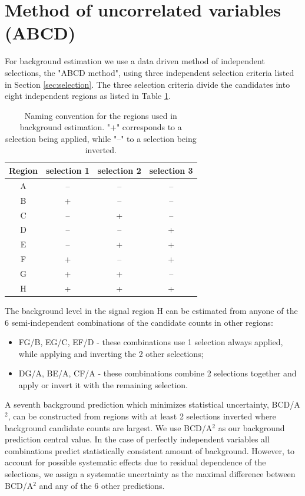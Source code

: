 
\section{Method of uncorrelated variables (ABCD)}
\label{sec:abcd}
For background estimation we use a data driven method of independent selections, the "ABCD method", using
 three independent selection criteria listed in Section \ref{sec:selection}. 
The three selection criteria divide the candidates into eight
independent regions as listed in Table \ref{tab:regions}.

\begin{table}[htbp]
\centering
\caption{Naming convention for the regions used in background estimation. "+" corresponds to a selection 
being applied, while "--" to a selection being inverted. \label{tab:regions}}
\begin{tabular}{cccc}
 \hline
  Region & selection 1 & selection 2 & selection 3 \\
 \hline
 A & -- & -- & -- \\
 B & + & -- & -- \\
 C & -- & + & -- \\
 D & -- & -- & + \\
 E & -- & + & + \\
 F & + & -- & + \\
 G & + & + & -- \\
 H & + & + & + \\
\hline
\end{tabular} 
\end{table}

The background level in the signal region H can be estimated from anyone of the 6 semi-independent combinations
of the candidate counts in other regions:
\begin{itemize}
\item FG/B, EG/C, EF/D - these combinations use 1 selection always applied, while applying and inverting the 
2 other selections;
\item DG/A, BE/A, CF/A - these combinations combine 2 selections together and apply or invert it with the 
remaining selection.
\end{itemize}

A seventh background prediction which minimizes statistical uncertainty, BCD/A$^2$, can be constructed from regions
with at least 2 selections inverted where background candidate counts are largest. 
We use BCD/A$^2$ as our background prediction central value. In the case of perfectly independent 
variables all combinations predict statistically consistent  amount of background. 
However, to account for possible systematic
effects due to residual dependence of the selections, we assign a systematic uncertainty as the maximal difference 
between BCD/A$^2$ and any of the 6 other predictions.

